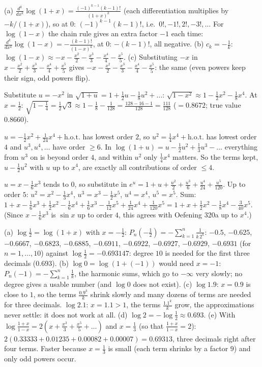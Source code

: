  (a) $\frac{d^k}{dx^k}\log(1+x)=\frac{(-1)^{k-1}(k-1)!}{(1+x)^k}$ (each differentiation multiplies by $-k/(1+x)$), so at $0$: $(-1)^{k-1}(k-1)!$, i.e.\ $0!,-1!,2!,-3!,\dots$ For $\log(1-x)$ the chain rule gives an extra factor $-1$ each time: $\frac{d^k}{dx^k}\log(1-x)=-\frac{(k-1)!}{(1-x)^k}$, at $0$: $-(k-1)!$, all negative. (b) $c_k=-\frac1k$: $\log(1-x)\approx-x-\frac{x^2}2-\frac{x^3}3-\frac{x^4}4-\frac{x^5}5$. (c) Substituting $-x$ in $x-\frac{x^2}2+\frac{x^3}3-\frac{x^4}4+\frac{x^5}5$ gives $-x-\frac{x^2}2-\frac{x^3}3-\frac{x^4}4-\frac{x^5}5$: the same (even powers keep their sign, odd powers flip).

 Substitute $u=-x^2$ in $\sqrt{1+u}=1+\frac12u-\frac18u^2+\dots$: $\sqrt{1-x^2}\approx1-\frac12x^2-\frac18x^4$. At $x=\frac12$: $\sqrt{1-\frac14}=\frac12\sqrt3\approx1-\frac18-\frac1{128}=\frac{128-16-1}{128}=\frac{111}{128}$ ($=0.8672$; true value $0.8660$).

 $u=-\frac12x^2+\frac1{24}x^4+\text{h.o.t.}$ has lowest order $2$, so $u^2=\frac14x^4+\text{h.o.t.}$ has lowest order $4$ and $u^3,u^4,\dots$ have order $\ge6$. In $\log(1+u)=u-\frac12u^2+\frac13u^3-\dots$ everything from $u^3$ on is beyond order $4$, and within $u^2$ only $\frac14x^4$ matters. So the terms kept, $u-\frac12u^2$ with $u$ up to $x^4$, are exactly all contributions of order $\le4$.

 $u=x-\frac16x^3$ tends to $0$, so substitute in $e^u=1+u+\frac{u^2}2+\frac{u^3}6+\frac{u^4}{24}+\frac{u^5}{120}$. Up to order $5$: $u^2=x^2-\frac13x^4$, $u^3=x^3-\frac12x^5$, $u^4=x^4$, $u^5=x^5$. Sum: $1+x-\frac16x^3+\frac12x^2-\frac16x^4+\frac16x^3-\frac1{12}x^5+\frac1{24}x^4+\frac1{120}x^5=1+x+\frac12x^2-\frac18x^4-\frac3{40}x^5$. (Since $x-\frac16x^3$ is $\sin x$ up to order $4$, this agrees with Oefening 320a up to $x^4$.)

 (a) $\log\frac12=\log(1+x)$ with $x=-\frac12$: $P_n(-\frac12)=-\sum_{k=1}^n\frac{1}{k\,2^k}$: $-0.5$, $-0.625$, $-0.6667$, $-0.6823$, $-0.6885$, $-0.6911$, $-0.6922$, $-0.6927$, $-0.6929$, $-0.6931$ (for $n=1,\dots,10$) against $\log\frac12=-0.693147$: degree $10$ is needed for the first three decimals ($0.693$). (b) $\log0=\log(1+(-1))$ would need $x=-1$: $P_n(-1)=-\sum_{k=1}^n\frac1k$, the harmonic sums, which go to $-\infty$ very slowly; no degree gives a usable number (and $\log0$ does not exist). (c) $\log1.9$: $x=0.9$ is close to $1$, so the terms $\frac{0.9^k}k$ shrink slowly and many dozens of terms are needed for three decimals. $\log2.1$: $x=1.1>1$, the terms $\frac{1.1^k}k$ grow, the approximations never settle: it does not work at all. (d) $\log2=-\log\frac12\approx0.693$. (e) With $\log\frac{1+x}{1-x}=2(x+\frac{x^3}3+\frac{x^5}5+\dots)$ and $x=\frac13$ (so that $\frac{1+x}{1-x}=2$): $2(0.33333+0.01235+0.00082+0.00007)=0.69313$, three decimals right after four terms. Faster because $x=\frac13$ is small (each term shrinks by a factor $9$) and only odd powers occur.

